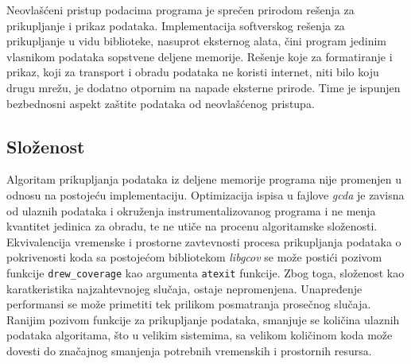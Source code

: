 \documentclass[12pt,oneside]{memoir}
\newcommand{\kod}[1]{\texttt{#1}}
\newcommand{\strano}[1]{\textit{#1}}
\begin{document}
Neovlašćeni pristup podacima programa je sprečen prirodom rešenja za prikupljanje i prikaz podataka. Implementacija softverskog rešenja za prikupljanje u vidu biblioteke, nasuprot eksternog alata, čini program jedinim vlasnikom podataka sopstvene deljene memorije. Rešenje koje za formatiranje i prikaz, koji za transport i obradu podataka ne koristi internet, niti bilo koju drugu mrežu, je dodatno otpornim na napade eksterne prirode. Time je ispunjen bezbednosni aspekt zaštite podataka od neovlašćenog pristupa. 

\subsection{Složenost}

Algoritam prikupljanja podataka iz deljene memorije programa nije promenjen u odnosu na postojeću implementaciju. Optimizacija ispisa u fajlove \strano{gcda} je zavisna od ulaznih podataka i okruženja instrumentalizovanog programa i ne menja kvantitet jedinica za obradu, te ne utiče na procenu algoritamske složenosti. Ekvivalencija vremenske i prostorne zavtevnosti procesa prikupljanja podataka o pokrivenosti koda sa postojećom bibliotekom \strano{libgcov} se može postići pozivom funkcije \kod{drew\_coverage} kao argumenta \kod{atexit} funkcije. Zbog toga, složenost kao karatkeristika najzahtevnojeg slučaja, ostaje nepromenjena. Unapređenje performansi se može primetiti tek prilikom posmatranja prosečnog slučaja. Ranijim pozivom funkcije za prikupljanje podataka, smanjuje se količina ulaznih podataka algoritama, što u velikim sistemima, sa velikom količinom koda može dovesti do značajnog smanjenja potrebnih vremenskih i prostornih resursa. 
\end{document}
